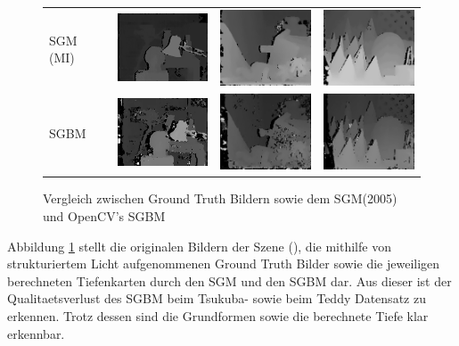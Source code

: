 \begin{figure}[h]
\begin{tabular}{m{2cm} m{3.3cm} m{3.3cm} m{3.3cm}}
	\\
	{\scriptsize SGM (MI)} &
	\includegraphics[width=3cm]{img/disparity_images/sgm_tsukuba.png} &
	\includegraphics[width=3cm]{img/disparity_images/sgm_teddy.png} &
	\includegraphics[width=3cm]{img/disparity_images/sgm_cones.png}
	\\ 
	{\scriptsize SGBM} &
	\includegraphics[width=3cm]{img/disparity_images/sgbm_tsukuba.png} &
	\includegraphics[width=3cm]{img/disparity_images/sgbm_teddy.png} &
	\includegraphics[width=3cm]{img/disparity_images/sgbm_cones.png}
	 \\ 
	\end{tabular}
\caption{Vergleich zwischen Ground Truth Bildern sowie dem SGM(2005) und OpenCV's SGBM}
\label{fig:disparity_comparison}
\end{figure}

\noindent
Abbildung \ref{fig:disparity_comparison} stellt die originalen Bildern der Szene (\cite{middlebury_data}), die mithilfe von strukturiertem Licht aufgenommenen Ground Truth Bilder sowie die jeweiligen berechneten Tiefenkarten durch den SGM und den SGBM dar. Aus dieser ist der Qualitaetsverlust des SGBM beim Tsukuba- sowie beim Teddy Datensatz zu erkennen. Trotz dessen sind die Grundformen sowie die berechnete Tiefe klar erkennbar. 

